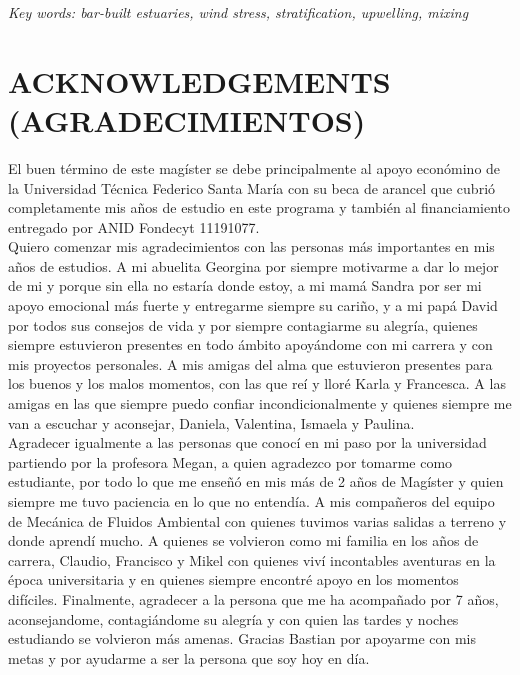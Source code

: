 \documentclass[11pt,letterpaper]{article}
\begin{document}
    \textit{Key words: bar-built estuaries, wind stress, stratification, upwelling, mixing}

    \newpage
    \section*{ACKNOWLEDGEMENTS (AGRADECIMIENTOS)}

    El buen término de este magíster se debe principalmente al apoyo económino de la Universidad Técnica Federico Santa María con su beca de arancel que cubrió completamente mis años de estudio en este programa y también al financiamiento entregado por ANID Fondecyt 11191077.\\
    
    Quiero comenzar mis agradecimientos con las personas más importantes en mis años de estudios. A mi abuelita Georgina por siempre motivarme a dar lo mejor de mi y porque sin ella no estaría donde estoy, a mi mamá Sandra por ser mi apoyo emocional más fuerte y entregarme siempre su cariño, y a mi papá David por todos sus consejos de vida y por siempre contagiarme su alegría, quienes siempre estuvieron presentes en todo ámbito apoyándome con mi carrera y con mis proyectos personales. A mis amigas del alma que estuvieron presentes para los buenos y los malos momentos, con las que reí y lloré Karla y Francesca. A las amigas en las que siempre puedo confiar incondicionalmente y quienes siempre me van a escuchar y aconsejar, Daniela, Valentina, Ismaela y Paulina.\\

    Agradecer igualmente a las personas que conocí en mi paso por la universidad partiendo por la profesora Megan, a quien agradezco por tomarme como estudiante, por todo lo que me enseñó en mis más de 2 años de Magíster y quien siempre me tuvo paciencia en lo que no entendía. A mis compañeros del equipo de Mecánica de Fluidos Ambiental con quienes tuvimos varias salidas a terreno y donde aprendí mucho. A quienes se volvieron como mi familia en los años de carrera, Claudio, Francisco y Mikel con quienes viví incontables aventuras en la época universitaria y en quienes siempre encontré apoyo en los momentos difíciles. Finalmente, agradecer a la persona que me ha acompañado por 7 años, aconsejandome, contagiándome su alegría y con quien las tardes y noches estudiando se volvieron más amenas. Gracias Bastian por apoyarme con mis metas y por ayudarme a ser la persona que soy hoy en día.  \\



    \newpage
    
    \tableofcontents
    
    \listoffigures
    
    \listoftables
    
    \newpage
    
    
    
    
    
    
    \newpage
    
    \newpage
    


\end{document}
